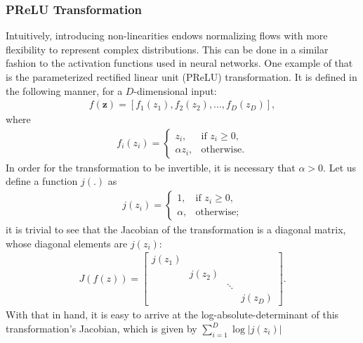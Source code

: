 \subsubsection{PReLU Transformation}
Intuitively, introducing non-linearities endows normalizing flows with more flexibility to
represent complex distributions. This can be done in a similar fashion to the
activation functions used in neural networks. One example of that is the parameterized
rectified linear unit (PReLU) transformation. It is defined in the following manner, for
a $D$-dimensional input:
\begin{align}
f(\bm{z}) = [f_1(z_1), f_2(z_2), ..., f_D(z_D)],
\end{align} where
\begin{align}
f_i(z_i) =
    \begin{cases}
        z_i,              & \text{if } z_i\geq 0, \\
        \alpha z_i,       & \text{otherwise}.
    \end{cases}
\end{align}
In order for the transformation to be invertible, it is necessary
that $\alpha > 0$.
Let us define a function $j(.)$ as
\begin{align}
j(z_i) =
    \begin{cases}
       1 ,              & \text{if } z_i \geq 0, \\
       \alpha ,       & \text{otherwise};
    \end{cases}
\end{align}
it is trivial to see that the Jacobian of the transformation is a diagonal
matrix, whose diagonal elements are $j(z_i)$:
\begin{align}
  J(f(z)) =
  \begin{bmatrix}
      j(z_1) & & & \\
      & j(z_2) & & \\
      & & \ddots & \\
      & & & j(z_D)
  \end{bmatrix}.
\end{align}
With that in hand, it is easy to arrive at the log-absolute-determinant of this transformation's
Jacobian, which is given by $\sum_{i=1}^D \log \big| j(z_i) \big|$

